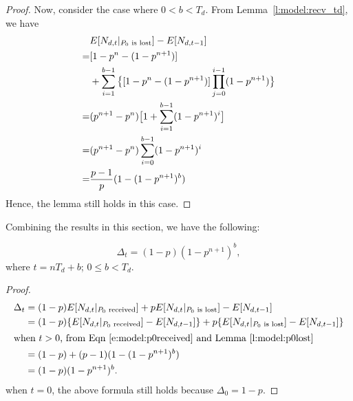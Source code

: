 \begin{proof}
    Now, consider the case where $0 < b < T_d$.
    From Lemma~\ref{l:model:recv_td},
    we have
    \begin{align*}
     &E[N_{d,t}|_{\textrm{$P_0$ is lost}}] - E[N_{d,t-1}] \\
    =&[1-p^n - (1-p^{n+1})]\\
     &+ \sum_{i=1}^{b-1}\big\{[1-p^n - (1-p^{n+1})]\prod_{j=0}^{i-1}(1-p^{n+1})\big\} \\
    =&(p^{n+1} - p^n)\big[1 + \sum_{i=1}^{b-1}(1-p^{n+1})^i\big]\\
    =&(p^{n+1} - p^n)\sum_{i=0}^{b-1}(1-p^{n+1})^i\\
    =&\dfrac{p-1}{p}(1- (1-p^{n+1})^b) \\
    \end{align*}
    Hence, the lemma still holds in this case.
    \QED
    \end{proof}
    
    Combining the results in this section, we have the following:
    \begin{lemma}
    \label{l:model:worst}
    \[
        \Delta_t = (1-p)(1-p^{n+1})^b,
    \]
    where $t=nT_d+b$; $0 \le b<T_d$.
    \end{lemma}
    \if{}
    \begin{proof}
    \begin{align*}
    \Delta_t &= (1-p)E[N_{d,t}|_\textrm{$P_0$ received}] + pE[N_{d,t}|_{\textrm{$P_0$ is lost}}]
    - E[N_{d,t-1}]\\
             &= (1-p)\{E[N_{d,t}|_\textrm{$P_0$ received}] - E[N_{d, t-1}]\} 
             + p\{E[N_{d,t}|_{\textrm{$P_0$ is lost}}] - E[N_{d, t-1}]\}\\
    \intertext{when $t>0$, from Eqn \ref{e:model:p0received} and Lemma~\ref{l:model:p0lost}}
             &= (1-p)+(p-1)(1-(1-p^{n+1})^b)\\
             &=(1-p)(1-p^{n+1})^b.
    \end{align*}
    when $t=0$, the above formula still holds because $\Delta_0 = 1-p$.
    \QED
    \end{proof}
    \fi

